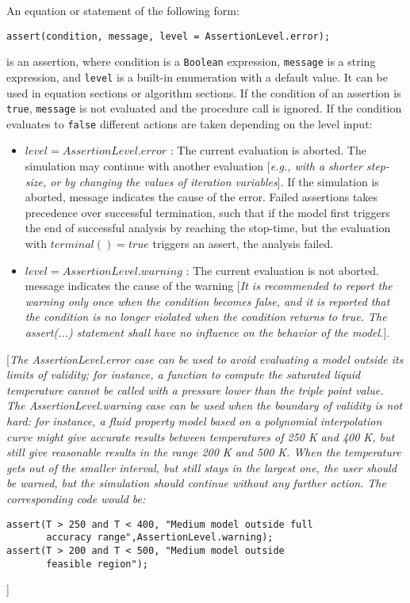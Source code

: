 \documentclass[11pt,a4paper,notitlepage]{report}
\begin{document}
An equation or statement of the following form:
\begin{verbatim}
assert(condition, message, level = AssertionLevel.error);
\end{verbatim}
is an assertion, where condition is a \verb"Boolean" expression, \verb"message" is a string expression, and \verb"level" is a built-in enumeration with a default value. It can be used in equation sections or algorithm sections.
If the condition of an assertion is \verb"true", \verb"message" is not evaluated and the procedure call is ignored. If the condition evaluates to \verb"false" different actions are taken depending on the level input:
\begin{itemize}
\item $level = AssertionLevel.error$ : The current evaluation is aborted. The simulation may continue
with another evaluation [\emph{e.g., with a shorter step-size, or by changing the values of iteration variables}]. If the simulation is aborted, message indicates the cause of the error. Failed assertions takes precedence over successful termination, such that if the model first triggers the
end of successful analysis by reaching the stop-time, but the evaluation with $terminal()=true$ triggers an assert, the analysis failed. 
\item $level = AssertionLevel.warning$ : The current evaluation is not aborted. message indicates the
cause of the warning [\emph{It is recommended to report the warning only once when the condition becomes false, and it is reported that the condition is no longer violated when the condition returns to true. The assert(...) statement shall have no influence on the behavior of the model.}]. 
\end{itemize}
[\emph{The AssertionLevel.error case can be used to avoid evaluating a model outside its limits of validity; for instance, a function to compute the saturated liquid temperature cannot be called with a pressure lower than the triple point value. The AssertionLevel.warning case can be used when the boundary of validity is not hard: for instance, a fluid property model based on a polynomial interpolation curve might give accurate results between temperatures of 250 K and 400 K, but still give reasonable results in the range 200 K and 500 K. When the temperature gets out of the smaller interval, but still stays in the largest one, the user should be warned, but the simulation should continue without any further action. The corresponding code would be:}
\begin{verbatim}
assert(T > 250 and T < 400, "Medium model outside full 
       accuracy range",AssertionLevel.warning);
assert(T > 200 and T < 500, "Medium model outside 
       feasible region");
\end{verbatim}
]
\end{document}
